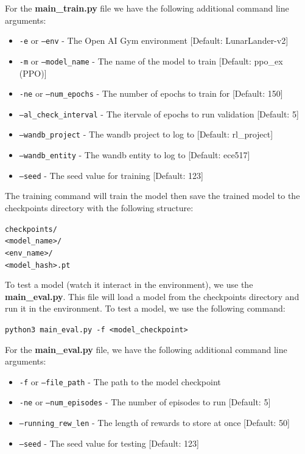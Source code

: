 For the \textbf{main\_train.py} file we have the following additional command line arguments:
\begin{itemize}
    \item \texttt{-e} or \texttt{--env} - The Open AI Gym environment [Default: LunarLander-v2]
    \item \texttt{-m} or \texttt{--model\_name} - The name of the model to train [Default: ppo\_ex (PPO)]
    \item \texttt{-ne} or \texttt{--num\_epochs} - The number of epochs to train for [Default: 150]
    \item \texttt{--al\_check\_interval} - The itervale of epochs to run validation [Default: 5]
    \item \texttt{--wandb\_project} - The wandb project to log to [Default: rl\_project]
    \item \texttt{--wandb\_entity} - The wandb entity to log to [Default: ece517]
    \item \texttt{--seed} - The seed value for training [Default: 123]
\end{itemize}

The training command will train the model then save the trained model to the checkpoints directory with the following structure:
\begin{center}
    \texttt{checkpoints/\\<model\_name>/\\<env\_name>/\\<model\_hash>.pt}
\end{center}

To test a model (watch it interact in the environment), we use the \textbf{main\_eval.py}. This file will load a model from the checkpoints directory and
run it in the environment.
To test a model, we use the following command:
\begin{center}
    \texttt{python3 main\_eval.py -f <model\_checkpoint>}
\end{center}

For the \textbf{main\_eval.py} file, we have the following additional command line arguments:
\begin{itemize}
    \item \texttt{-f} or \texttt{--file\_path} - The path to the model checkpoint
    \item \texttt{-ne} or \texttt{--num\_episodes} - The number of episodes to run [Default: 5]
    \item \texttt{--running\_rew\_len} - The length of rewards to store at once [Default: 50]
    \item \texttt{--seed} - The seed value for testing [Default: 123]
\end{itemize}

